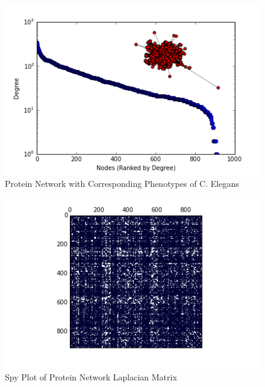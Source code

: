 \documentclass{article}
\begin{document}
\begin{figure}
\centering

\includegraphics[width=\linewidth]{gene_degree_histogram.png}
\caption{Protein Network with Corresponding Phenotypes of C. Elegans \cite{Simonis:2009}}
  
\end{figure}

\begin{figure}
\centering
\includegraphics[width = \linewidth]{genespy.png}
\caption{Spy Plot of Protein Network Laplacian Matrix}
\end{figure}
\end{document}
